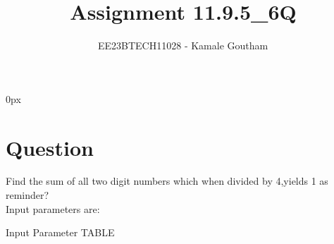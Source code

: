 \documentclass[journal,12pt,twocolumn]{IEEEtran}
\theoremstyle{remark}
\begin{document}
\parindent 0px

\title{Assignment 11.9.5\_6Q}
\author{EE23BTECH11028 - Kamale Goutham$^{}$%
}
\maketitle
\newpage
\bigskip
\section*{Question}
Find the sum of all two digit numbers which when divided by 4,yields 1 as reminder?\\
\solution 
Input parameters are:\\
\begin{table}[ht]
    \centering
    \def\arraystretch{1.5}
    
    \caption{Input Parameter TABLE}
    \label{tab:11.9.5.6}
\end{table}
\end{document}

